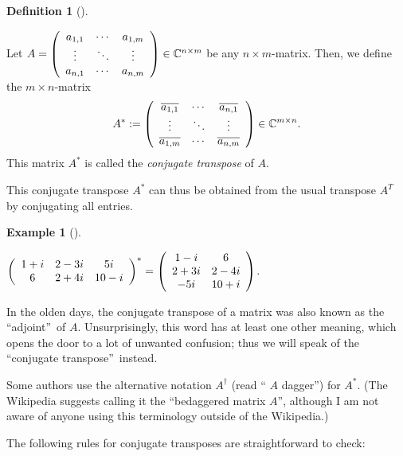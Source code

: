 \documentclass[numbers=enddot,12pt,final,onecolumn,notitlepage]{scrartcl}%
\numberwithin{exer}{subsection}
\theoremstyle{definition}
\newtheorem{defi}[theo]{Definition}
\newenvironment{definition}[1][]
{\begin{defi}[#1]\begin{leftbar}}
{\end{leftbar}\end{defi}}
\newtheorem{exam}[theo]{Example}
\newenvironment{example}[1][]
{\begin{exam}[#1]\begin{leftbar}}
{\end{leftbar}\end{exam}}
\begin{document}
\begin{definition}
\label{def.unitary.innerprod.A*}Let $A=\left(
\begin{array}
[c]{ccc}%
a_{1,1} & \cdots & a_{1,m}\\
\vdots & \ddots & \vdots\\
a_{n,1} & \cdots & a_{n,m}%
\end{array}
\right)  \in\mathbb{C}^{n\times m}$ be any $n\times m$-matrix. Then, we define
the $m\times n$-matrix%
\[
A^{\ast}:=\left(
\begin{array}
[c]{ccc}%
\overline{a_{1,1}} & \cdots & \overline{a_{n,1}}\\
\vdots & \ddots & \vdots\\
\overline{a_{1,m}} & \cdots & \overline{a_{n,m}}%
\end{array}
\right)  \in\mathbb{C}^{m\times n}.
\]
This matrix $A^{\ast}$ is called the \emph{conjugate transpose} of $A$.
\end{definition}

This conjugate transpose $A^{\ast}$ can thus be obtained from the usual
transpose $A^{T}$ by conjugating all entries.

\begin{example}
$\left(
\begin{array}
[c]{ccc}%
1+i & 2-3i & 5i\\
6 & 2+4i & 10-i
\end{array}
\right)  ^{\ast}=\left(
\begin{array}
[c]{cc}%
1-i & 6\\
2+3i & 2-4i\\
-5i & 10+i
\end{array}
\right)  $.
\end{example}

In the olden days, the conjugate transpose of a matrix was also known as the
\textquotedblleft adjoint\textquotedblright\ of $A$. Unsurprisingly, this word
has at least one other meaning, which opens the door to a lot of unwanted
confusion; thus we will speak of the \textquotedblleft conjugate
transpose\textquotedblright\ instead.

Some authors use the alternative notation $A^{\dag}$ (read \textquotedblleft%
$A$ dagger\textquotedblright) for $A^{\ast}$. (The Wikipedia suggests calling
it the \textquotedblleft bedaggered matrix $A$\textquotedblright, although I
am not aware of anyone using this terminology outside of the Wikipedia.)
\medskip

The following rules for conjugate transposes are straightforward to check:
\end{document}
